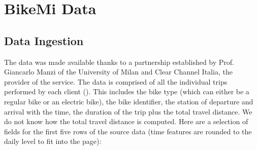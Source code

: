 \documentclass[letterpaper,10pt,english]{jupyterBook}
\begin{document}
\chapter{BikeMi Data}
\label{\detokenize{03-data_ingestion_and_spatial_operations:bikemi-data}}\label{\detokenize{03-data_ingestion_and_spatial_operations::doc}}

\section{Data Ingestion}
\label{\detokenize{03-data_ingestion_and_spatial_operations:data-ingestion}}
\sphinxAtStartPar
The data was made available thanks to a partnership established by Prof. Giancarlo Manzi of the University of Milan and Clear Channel Italia, the provider of the service. The data is comprised of all the individual trips performed by each client (). This includes the bike type (which can either be a regular bike or an electric bike), the bike identifier, the station of departure and arrival with the time, the duration of the trip  plus the total travel distance. We do not know how the total travel distance  is computed. Here are a selection of fields for the first five rows of the source data (time features are rounded to the daily level to fit into the page):
\end{document}
